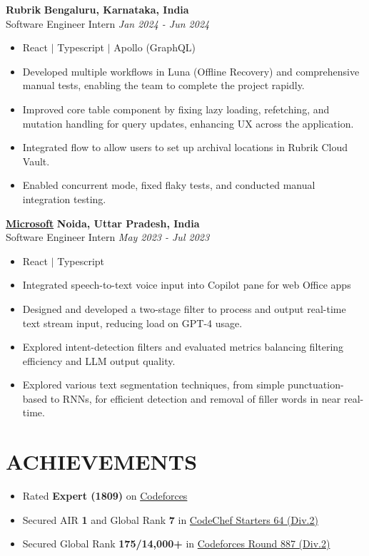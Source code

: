 \documentclass[12pt]{article}
\begin{document}
\textbf{Rubrik} \hfill \textbf{Bengaluru, Karnataka, India} \\
Software Engineer Intern  \hfill \textit{Jan 2024 - Jun 2024} \\
\begin{itemize}[topsep=1pt, itemsep=1.5pt, partopsep=1pt, parsep=1pt]
	\item React $|$ Typescript $|$ Apollo (GraphQL)
	\item Developed multiple workflows in Luna (Offline Recovery) and comprehensive manual tests, enabling the team to complete the project rapidly.
	\item Improved core table component by fixing lazy loading, refetching, and mutation handling for query updates, enhancing UX across the application.
	\item Integrated flow to allow users to set up archival locations in Rubrik Cloud Vault.
	\item Enabled concurrent mode, fixed flaky tests, and conducted manual integration testing.
\end{itemize}



\textbf{\href{https://drive.google.com/file/d/1AmHyhbctI577QKw8zxRCBjzVVyGyQHvb/view}{Microsoft}} \hfill \textbf{Noida, Uttar Pradesh, India} \\
Software Engineer Intern  \hfill \textit{May 2023 - Jul 2023} \\
\begin{itemize}[topsep=1pt, itemsep=1.5pt, partopsep=1pt, parsep=1pt]
	\item React $|$ Typescript
	\item Integrated speech-to-text voice input into Copilot pane for web Office apps
	\item Designed and developed a two-stage filter to process and output real-time text stream input, reducing load on GPT-4 usage.
	\item Explored intent-detection filters and evaluated metrics balancing filtering efficiency and LLM output quality.
	\item Explored various text segmentation techniques, from simple punctuation-based to RNNs, for efficient detection and removal of filler words in near real-time.
\end{itemize}

\section*{ACHIEVEMENTS}
\begin{itemize}[leftmargin=20pt, topsep=0.5pt, itemsep=0.5pt, partopsep=0.5pt, parsep=0.5pt]
    \item Rated \textbf{Expert (1809)} on \href{https://codeforces.com/profile/prabhavagrawal7}{Codeforces}
    \item Secured AIR \textbf{1} and Global Rank \textbf{7} in \href{https://www.codechef.com/rankings/START64B?filterBy=Country%3DIndia&itemsPerPage=100}{CodeChef Starters 64 (Div.2)}
    \item Secured Global Rank \textbf{175/14,000+} in \href{https://codeforces.com/contest/1853/standings/participant/159682595#p159682595}{Codeforces Round 887 (Div.2)}
\end{itemize}
\end{document}
